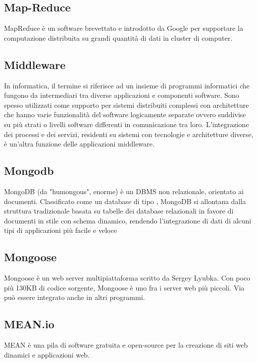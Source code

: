 {{				\subsection{Map-Reduce}
				MapReduce è un  software brevettato e introdotto da Google per supportare la computazione distribuita su grandi quantità di dati in cluster di computer.


				\subsection{Middleware}
				In informatica, il termine si riferisce ad un insieme di programmi informatici che fungono da intermediari tra diverse applicazioni e componenti software. Sono spesso utilizzati come supporto per sistemi distribuiti complessi con architetture che hanno varie funzionalità del software logicamente separate ovvero suddivise su più strati o livelli software differenti in comunicazione tra loro. L'integrazione dei processi e dei servizi, residenti su sistemi con tecnologie e architetture diverse, è un'altra funzione delle applicazioni middleware.



		\subsection{Mongodb}
		MongoDB (da "humongous", enorme) è un DBMS non relazionale, orientato ai documenti. Classificato come un database di tipo , MongoDB si allontana dalla struttura tradizionale basata su tabelle dei database relazionali in favore di documenti in stile  con schema dinamico, rendendo l'integrazione di dati di alcuni tipi di applicazioni più facile e veloce


		\subsection{Mongoose}
		Mongoose è un web server multipiattaforma scritto da Sergey Lyubka. Con poco più 130KB di codice sorgente, Mongoose è uno fra i server web più piccoli. Via  può essere integrato anche in altri programmi.


		\subsection{MEAN.io}
		MEAN è una pila di software  gratuita e open-source per la creazione di siti web dinamici e applicazioni web.


}}
